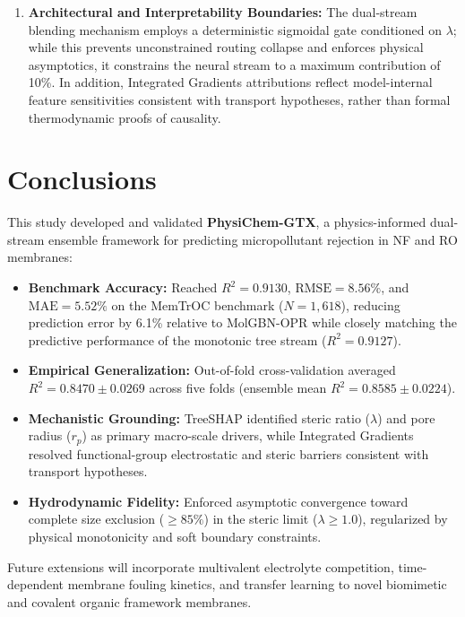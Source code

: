 \documentclass[11pt]{article}
\newcommand{\rsq}{R^{2}}
\begin{document}
\begin{enumerate}[leftmargin=1.3em,itemsep=2pt,topsep=2pt]
\item \textbf{Architectural and Interpretability Boundaries:} The dual-stream blending mechanism employs a deterministic sigmoidal gate conditioned on $\lambda$; while this prevents unconstrained routing collapse and enforces physical asymptotics, it constrains the neural stream to a maximum contribution of 10\%. In addition, Integrated Gradients attributions reflect model-internal feature sensitivities consistent with transport hypotheses, rather than formal thermodynamic proofs of causality.
\end{enumerate}

\section{Conclusions}
\label{sec:conclusions}

This study developed and validated \textbf{PhysiChem-GTX}, a physics-informed dual-stream ensemble framework for predicting micropollutant rejection in NF and RO membranes:
\begin{itemize}[leftmargin=1.3em,itemsep=2pt,topsep=3pt]
\item \textbf{Benchmark Accuracy:} Reached $\rsq = 0.9130$, $\mathrm{RMSE} = 8.56\%$, and $\mathrm{MAE} = 5.52\%$ on the MemTrOC benchmark ($N = 1{,}618$), reducing prediction error by 6.1\% relative to MolGBN-OPR while closely matching the predictive performance of the monotonic tree stream ($\rsq = 0.9127$).
\item \textbf{Empirical Generalization:} Out-of-fold cross-validation averaged $\rsq = 0.8470 \pm 0.0269$ across five folds (ensemble mean $\rsq = 0.8585 \pm 0.0224$).
\item \textbf{Mechanistic Grounding:} TreeSHAP identified steric ratio ($\lambda$) and pore radius ($r_p$) as primary macro-scale drivers, while Integrated Gradients resolved functional-group electrostatic and steric barriers consistent with transport hypotheses.
\item \textbf{Hydrodynamic Fidelity:} Enforced asymptotic convergence toward complete size exclusion ($\ge 85\%$) in the steric limit ($\lambda \geq 1.0$), regularized by physical monotonicity and soft boundary constraints.
\end{itemize}

Future extensions will incorporate multivalent electrolyte competition, time-dependent membrane fouling kinetics, and transfer learning to novel biomimetic and covalent organic framework membranes.
\end{document}
